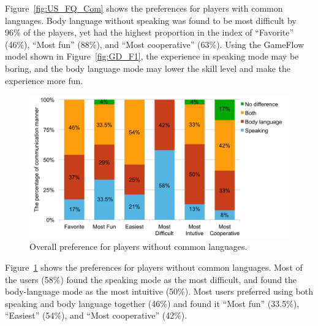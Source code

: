 Figure~\ref{fig:US_FQ_Com} shows the preferences for players with common languages. 
Body language without speaking was found to be most difficult by 96\% of the players, yet had the highest proportion in the index of ``Favorite'' (46\%), ``Most fun'' (88\%), and ``Most cooperative'' (63\%). Using the GameFlow model shown in Figure~\ref{fig:GD_F1}, the experience in speaking mode may be boring, and the body language mode may lower the skill level and make the experience more fun.




\begin{figure}[!t]
\centering
\includegraphics[width=0.9\columnwidth]{Figures/US_FQ_Dif.pdf}
\caption{Overall preference for players without common languages.}
\label{fig:US_FQ_Dif}
\end{figure}

Figure~\ref{fig:US_FQ_Dif} shows the preferences for players without common languages.
Most of the users (58\%) found the speaking mode as the most difficult, and found the body-language mode as the most intuitive (50\%). Most users preferred using both speaking and body language together (46\%) and found it ``Most fun'' (33.5\%), ``Easiest'' (54\%), and ``Most cooperative'' (42\%).


